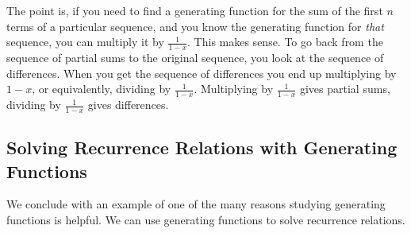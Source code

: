 \documentclass[12pt]{article}
\begin{document}
The point is, if you need to find a generating function for the sum of the first $n$ terms of a particular sequence, and you know the generating function for {\em that} sequence, you can multiply it by $\frac{1}{1-x}$.  This makes sense.  To go back from the sequence of partial sums to the original sequence, you look at the sequence of differences.  When you get the sequence of differences you end up multiplying by $1-x$, or equivalently, dividing by $\frac{1}{1-x}$.  Multiplying by $\frac{1}{1-x}$ gives partial sums, dividing by $\frac{1}{1-x}$ gives differences.
  

\subsection{Solving Recurrence Relations with Generating Functions}
We conclude with an example of one of the many reasons studying generating functions is helpful. We can use generating functions to solve recurrence relations.
\end{document}
